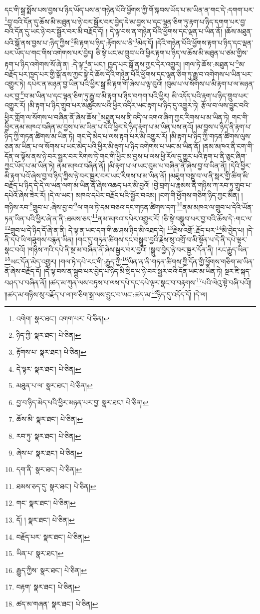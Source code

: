 དང་གི་སྒྲ་སྨོས་པས་བྱས་པ་ཉིད་ཡོད་པས་ན་གཉེན་པོའི་ཕྱོགས་ཀྱི་གོ་སྐབས་ཡོད་པ་མ་ཡིན་ན་གང་དེ་:དགག་པར་\footnote{འགེག་  སྣར་ཐང་། འགག་པར་  པེ་ཅིན། }བྱ་བའི་དོན་དུ་ཆོས་མི་མཐུན་པ་ཉེ་བར་སྦྱོར་བར་བྱེད་དེ་མ་བྱས་པ་དང་ལྷན་ཅིག་ཏུ་རྟག་པ་ཉིད་དགག་པར་བྱ་བའི་དོན་དུ་ཡང་ཉེ་བར་སྦྱོར་བར་མི་བརྗོད་དོ། །
དེ་ལྟ་བས་ན་གཉེན་པོའི་ཕྱོགས་དང་ལྡན་པ་ཡིན་ནོ། །ཆོས་མཐུན་པའི་སྒོ་ནས་བྱས་པ་:ཉིད་ཀྱིས་\footnote{ཉིད་ཀྱི་  སྣར་ཐང་།  པེ་ཅིན། }མི་རྟག་པ་ཉིད་:རྟོགས་པ་ནི་\footnote{རྟོགས་པ་  སྣར་ཐང་།  པེ་ཅིན། }མེད་དོ། །དེའི་གཉེན་པོའི་ཕྱོགས་རྟག་པ་ཉིད་དང་ལྡན་པར་ཡོད་པ་གང་གིས་འགེགས་པར་བྱེད། ཅི་སྟེ་ཡང་མ་གྲུབ་པའི་ཕྱིར་རྟག་པ་ཉིད་ལ་ཆོས་མི་མཐུན་པ་ཙམ་གྱིས་རྟག་པ་ཉིད་འགེགས་སོ་ཞེ་ན། :དེ་ལྟ་\footnote{དེ་ལྟར་  སྣར་ཐང་།  པེ་ཅིན། }ན་ཡང་། ཁྱད་པར་སྒོ་ནས་ཀྱང་དེར་འགྱུར། །གལ་ཏེ་ཆོས་:མཐུན་པ་\footnote{མཐུན་པ་ལ་  སྣར་ཐང་།  པེ་ཅིན། }མ་བརྗོད་པར་ཁྱད་པར་གྱི་སྒོ་ནས་ཀྱང་སྟེ་དེ་ཆོས་དེའི་གཉེན་པོའི་ཕྱོགས་དང་ལྷན་ཅིག་ཏུ་རྒྱུ་བ་འགེགས་པ་ཡིན་པར་འགྱུར་ཏེ། དཔེར་ན་མཉན་བྱ་ཡིན་པའི་ཕྱིར་སྒྲ་མི་རྟག་གོ་ཞེས་པ་ལྟ་བུའོ། །བུམ་པ་ལ་སོགས་པ་མི་རྟག་པ་ལ་མཉན་པར་བྱ་\footnote{བྱ་བ་ཉིད་མེད་པའི་ཕྱིར་མཉན་པར་བྱ་  སྣར་ཐང་།  པེ་ཅིན། }བ་མ་ཡིན་པ་དང་ལྷན་ཅིག་ཏུ་རྒྱུ་བ་མི་རྟག་པ་ཉིད་བཀག་པའི་ཕྱིར། མི་འདོད་པའི་རྟག་པ་ཉིད་གྲུབ་པར་འགྱུར་རོ། །མི་རྟག་པ་ཉིད་གྲུབ་པར་མཚུངས་པའི་ཕྱིར་འདིར་ཡང་རྟག་པ་ཉིད་དུ་འགྱུར་ཏེ། རྩོལ་བ་ལས་བྱུང་བའི་ཕྱིར་གློག་ལ་སོགས་པ་བཞིན་ནོ་ཞེས་ཆོས་\footnote{ཆོས་མི་  སྣར་ཐང་།  པེ་ཅིན། }མཐུན་པས་ནི་འདི་ལ་འགའ་ཞིག་ཀྱང་རིགས་པ་མ་ཡིན་ཏེ། གང་གི་ཕྱིར་ནམ་མཁའ་བཞིན་མ་བྱས་པ་མ་ཡིན་པ་དེའི་ཕྱིར་དེ་ཉིད་རྟག་པ་མ་ཡིན་པས་ནའོ། །མ་བྱས་པ་ཉིད་ནི་རྟག་པ་ཉིད་ཀྱི་གཏན་ཚིགས་མ་ཡིན་ཏེ། གང་དེ་མེད་པ་ལས་རྟག་པར་མི་འགྱུར་རོ། །མི་རྟག་པ་ཉིད་ཀྱི་གཏན་ཚིགས་ལུས་ཅན་མ་ཡིན་པ་ལ་སོགས་པ་ཡང་མེད་པའི་ཕྱིར་མི་རྟག་པ་ཉིད་འགེགས་པ་ཡང་མ་ཡིན་ནོ། །ནམ་མཁའ་ནི་ངག་གི་དོན་ལ་ལྟོས་ནས་ཉེ་བར་སྦྱར་བར་རིགས་ཏེ་གང་གི་ཕྱིར་མ་བྱས་པ་ལས་ཕྱི་རོལ་དུ་གྱུར་པའི་རྟག་པ་ནི་ཅུང་ཞིག་ཀྱང་ཡོད་པ་མ་ཡིན་ཏེ། ནམ་མཁའ་བཞིན་ནོ། །མི་རྟག་པ་ལ་ཡང་བུམ་པ་བཞིན་ནོ་ཞེས་བྱ་བ་ཡིན་ནོ། །དེའི་ཕྱིར་མི་རྟག་པའོ་ཞེས་བྱ་བ་ཉིད་ཀྱིས་ཉེ་བར་སྦྱར་བར་ཡང་རིགས་པ་མ་ཡིན་ནོ། །མཇུག་བསྡུ་བ་ལ་ནི་སླར་གྱི་ཚིག་མི་བརྗོད་པ་ཉིད་དེ་དེ་ལ་ཡན་ལག་མ་ཡིན་ནོ་ཞེས་འཆད་པར་མི་བྱའོ། །བྱེ་བྲག་པ་རྣམས་ནི་གཉིས་ཀ་རབ་ཏུ་གྲུབ་པ་དཔེའོ་ཞེས་ཟེར་རོ། །དེ་ལ་ཡང་། མཁའ་དཔེར་བརྗོད་པའི་སྦྱོར་བའམ། །ངག་གི་ཕྱོགས་གཅིག་ཉིད་ཀྱང་མིན། །གཉིས་རབ་\footnote{རབ་ཏུ་  སྣར་ཐང་།  པེ་ཅིན། }གྲུབ་པ་:ཞེས་བྱ་བ་\footnote{ཞེས་པ་  སྣར་ཐང་།  པེ་ཅིན། }ལ་གལ་ཏེ་དམ་བཅའ་དང་གཏན་ཚིགས་དག་\footnote{དག་ནི་  སྣར་ཐང་།  པེ་ཅིན། }ནམ་མཁའ་ལ་གྲུབ་པ་དེའི་ཡོན་ཏན་ཡིན་པའི་ཕྱིར་ཞེ་ན་ནི་:ཐམས་ཅད་\footnote{ཐམས་ཅད་དུ་  སྣར་ཐང་།  པེ་ཅིན། }ནམ་མཁའ་དཔེར་འགྱུར་རོ། །ཅི་སྟེ་བསྒྲུབ་པར་བྱ་བའི་ཆོས་དེ་:གང་ལ་\footnote{གང་  སྣར་ཐང་།  པེ་ཅིན། }གྲུབ་པ་དེ་ཉིད་དོ་ཞེ་ན་ནི། དེ་ལྟ་ན་ཡང་དག་གི་ཆ་ཤས་ཉིད་མི་འཐད་དེ། \footnote{དོ། །   སྣར་ཐང་།  པེ་ཅིན། }རྗེས་འགྲོ་:རྗོད་པར་\footnote{བརྗོད་པར་  སྣར་ཐང་།  པེ་ཅིན། }མི་བྱེད་པ། །དེ་ནི་དཔེ་ཡི་གཟུགས་བརྙན་ཡིན། །གང་དུ་གཏན་ཚིགས་དང་བསྒྲུབ་བྱའི་རྗེས་སུ་འགྲོ་བ་མི་སྟོན་པ་དེ་ནི་དཔེ་ལྟར་སྣང་བའོ། །གཉིས་ཀའི་དཔེ་ནི་སྔ་མ་བཞིན་ནོ་ཞེས་སྦྱར་བར་བྱའོ། །སྒྲུབ་བྱེད་ཉེ་བར་སྦྱར་དོན་ནི། །རང་རྒྱུད་ཡིན་\footnote{ཡིན་པ་  སྣར་ཐང་། }ཡང་དོན་མེད་འགྱུར། །གལ་ཏེ་དཔེ་རང་གི་:རྒྱུད་ཀྱི་\footnote{རྒྱུད་ཀྱིས་  སྣར་ཐང་།  པེ་ཅིན། }ཡིན་ན་ནི་གཏན་ཚིགས་ཀྱི་དོན་གྱི་ཕྱོགས་གཅིག་མ་ཡིན་ནོ་ཞེས་བརྗོད་དོ། །དེ་ལྟ་བས་ན་སྒྲུབ་པར་བྱེད་པ་ཉིད་མི་སྲིད་པ་ཉེ་བར་སྦྱར་བའི་དོན་ཡང་མ་ཡིན་ཏེ། སྔར་ཇི་སྐད་བཤད་པ་བཞིན་ནོ། །ཚད་མ་ཀུན་ལས་བཏུས་པ་ལས་དཔེ་དང་དཔེ་ལྟར་སྣང་བ་བརྟགས་\footnote{བརྟག་  སྣར་ཐང་།  པེ་ཅིན། }པའི་ལེའུ་སྟེ་བཞི་པའོ།། །།ཚད་མ་གཉིས་སུ་བརྗོད་པ་ལ་ཁ་ཅིག་སྒྲ་ལས་བྱུང་བ་ཡང་:ཚད་མ་\footnote{ཚད་མ་གཞན་  སྣར་ཐང་།  པེ་ཅིན། }ཉིད་དུ་འདོད་དོ། །དེ་ལ། 